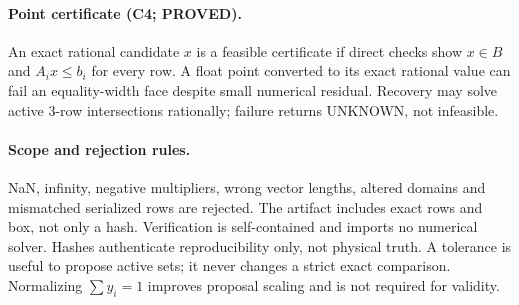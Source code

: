 \documentclass[11pt]{article}
\begin{document}
\paragraph{Point certificate (C4; PROVED).}
An exact rational candidate $x$ is a feasible certificate if direct checks show $x\in B$ and $A_ix\le b_i$ for every row. A float point converted to its exact rational value can fail an equality-width face despite small numerical residual. Recovery may solve active 3-row intersections rationally; failure returns UNKNOWN, not infeasible.

\paragraph{Scope and rejection rules.}
NaN, infinity, negative multipliers, wrong vector lengths, altered domains and mismatched serialized rows are rejected. The artifact includes exact rows and box, not only a hash. Verification is self-contained and imports no numerical solver. Hashes authenticate reproducibility only, not physical truth. A tolerance is useful to propose active sets; it never changes a strict exact comparison. Normalizing $\sum y_i=1$ improves proposal scaling and is not required for validity.
\end{document}
